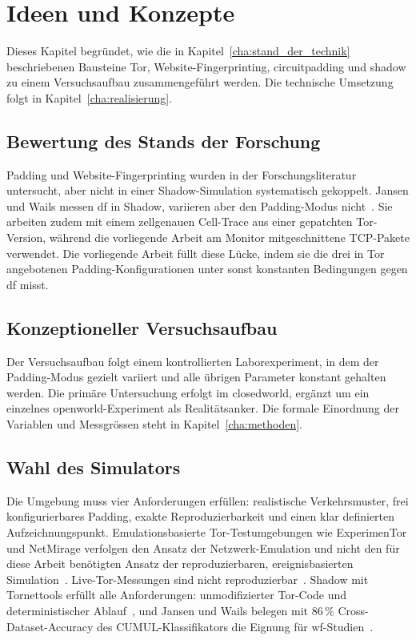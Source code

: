 \chapter{Ideen und Konzepte}
\label{cha:ideen_und_konzepte}

Dieses Kapitel begründet, wie die in Kapitel~\ref{cha:stand_der_technik} beschriebenen Bausteine Tor, Website-Fingerprinting, \gls{circuitpadding} und \gls{shadow} zu einem Versuchsaufbau zusammengeführt werden.
Die technische Umsetzung folgt in Kapitel~\ref{cha:realisierung}.

\section{Bewertung des Stands der Forschung}
\label{sec:konzepte_bewertung}

Padding und Website-Fingerprinting wurden in der Forschungsliteratur untersucht, aber nicht in einer Shadow-Simulation systematisch gekoppelt.
Jansen und Wails messen \gls{df} in Shadow, variieren aber den Padding-Modus nicht~\cite{jansen2023data}.
Sie arbeiten zudem mit einem zellgenauen Cell-Trace aus einer gepatchten Tor-Version, während die vorliegende Arbeit am Monitor mitgeschnittene TCP-Pakete verwendet.
Die vorliegende Arbeit füllt diese Lücke, indem sie die drei in Tor angebotenen Padding-Konfigurationen unter sonst konstanten Bedingungen gegen \gls{df} misst.

\section{Konzeptioneller Versuchsaufbau}
\label{sec:konzepte_versuchsaufbau}

Der Versuchsaufbau folgt einem kontrollierten Laborexperiment, in dem der Padding-Modus gezielt variiert und alle übrigen Parameter konstant gehalten werden.
Die primäre Untersuchung erfolgt im \gls{closedworld}, ergänzt um ein einzelnes \gls{openworld}-Experiment als Realitätsanker.
Die formale Einordnung der Variablen und Messgrössen steht in Kapitel~\ref{cha:methoden}.

\section{Wahl des Simulators}
\label{sec:konzepte_simulator}

Die Umgebung muss vier Anforderungen erfüllen: realistische Verkehrsmuster, frei konfigurierbares Padding, exakte Reproduzierbarkeit und einen klar definierten Aufzeichnungspunkt.
Emulationsbasierte Tor-Testumgebungen wie ExperimenTor und NetMirage verfolgen den Ansatz der Netzwerk-Emulation und nicht den für diese Arbeit benötigten Ansatz der reproduzierbaren, ereignisbasierten Simulation~\cite{neverenough-sec2021}.
Live-Tor-Messungen sind nicht reproduzierbar~\cite{jansen2023data}.
Shadow mit Tornettools erfüllt alle Anforderungen: unmodifizierter Tor-Code und deterministischer Ablauf~\cite{netsim-atc2022}, und Jansen und Wails belegen mit 86\,\% Cross-Dataset-Accuracy des CUMUL-Klassifikators die Eignung für \gls{wf}-Studien~\cite{jansen2023data}.


